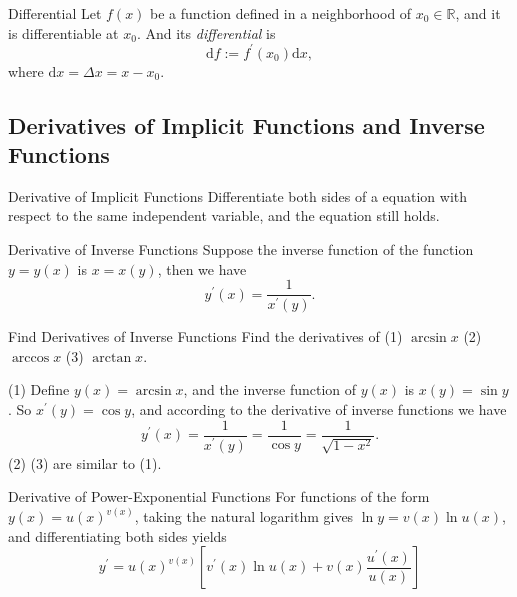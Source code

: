 \begin{definition}{Differential}{}
  Let $f(x)$ be a function defined in a neighborhood of $x_0 \in \mathbb{R}$,
  and it is differentiable at $x_0$.
  And its \emph{differential} is
  \begin{equation}
    \mathrm{d} f := f^{\prime}(x_0) \mathrm{d} x,
  \end{equation}
  where $\mathrm{d} x = \Delta x = x - x_0$.
\end{definition}

\subsection{Derivatives of Implicit Functions and Inverse Functions}

\begin{proposition}{Derivative of Implicit Functions}{}
  Differentiate both sides of a equation with respect to the same independent variable,
  and the equation still holds.
\end{proposition}

\begin{proposition}{Derivative of Inverse Functions}{}
  Suppose the inverse function of the function $y = y(x)$ is $x = x(y)$,
  then we have
  \begin{equation}
    y^{\prime}(x) = \frac{1}{x^{\prime}(y)}.
  \end{equation}
\end{proposition}

\begin{example}{Find Derivatives of Inverse Functions}{}
  Find the derivatives of
  (1) $\arcsin x$ (2) $\arccos x$ (3) $\arctan x$.
\end{example}

\begin{solution}
  (1) Define $y(x) = \arcsin x$, and the inverse function of $y(x)$ is
  $x(y) = \sin y$. So $x^{\prime}(y) = \cos y$, and according to the derivative
  of inverse functions we have
  \begin{equation}
    y^{\prime}(x) = \frac{1}{x^{\prime}(y)} = \frac{1}{\cos y} = \frac{1}{\sqrt{1 - x^2}}.
  \end{equation}
  (2) (3) are similar to (1).
\end{solution}

\begin{proposition}{Derivative of Power-Exponential Functions}{}
  For functions of the form $y(x) = u(x)^{v(x)}$,
  taking the natural logarithm gives $\ln y = v(x) \ln u(x)$,
  and differentiating both sides yields
  \begin{equation}
    y^{\prime}=u(x)^{v(x)}\left[v^{\prime}(x)\ln u(x)+v(x)\frac{u^{\prime}(x)}{u(x)}\right]
  \end{equation}
\end{proposition}

